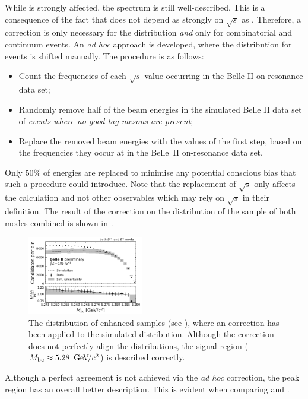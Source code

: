 While \Mbc is strongly affected, the \EB spectrum is still well-described.
This is a consequence of the fact that \EB does not depend as strongly on $\sqrt{s}$ as \Mbc.
Therefore, a correction is only necessary for the \Mbc distribution \textit{and} only for combinatorial \BB and continuum events.
An \textit{ad hoc} approach is developed, where the \Mbc distribution for \MC events is shifted manually. 
The procedure is as follows:
\begin{itemize}
    \item Count the frequencies of each $\sqrt{s}$ value occurring in the Belle II on-resonance data set;
    \item Randomly remove half of the beam energies in the simulated Belle II data set of \textit{events where no good tag-\B mesons are present};
    \item Replace the removed beam energies with the values of the first step, based on the frequencies they occur at in the Belle~II on-resonance data set.
\end{itemize}
Only $50\%$ of energies are replaced to minimise any potential conscious bias that such a procedure could introduce.
Note that the replacement of $\sqrt{s}$ only affects the \Mbc calculation and not other observables which may rely on $\sqrt{s}$ in their definition.
The result of the correction on the \Mbc distribution of the sample of both \FEI modes combined is shown in .
\begin{figure}[htbp!]
    \centering
    \includegraphics[width=0.45\textwidth]{figures/data_validation/Bboth_qqbar_enhanced_mbccorrected.pdf}
    \caption{\label{fig:qqbar_enhanced_mbccorrected} The \Mbc distribution of \qqbar enhanced samples (see ),
    where an \Mbc correction has been applied to the simulated distribution.
    Although the correction does not perfectly align the distributions, the signal region (${M_{\mathrm{bc}}}\approx5.28~{\mathrm{\,Ge\kern -0.1em V\!/}c^2}$) is described correctly.}
\end{figure}
Although a perfect agreement is not achieved via the \textit{ad hoc} correction, the peak region has an overall better description. 
This is evident when comparing  and .

